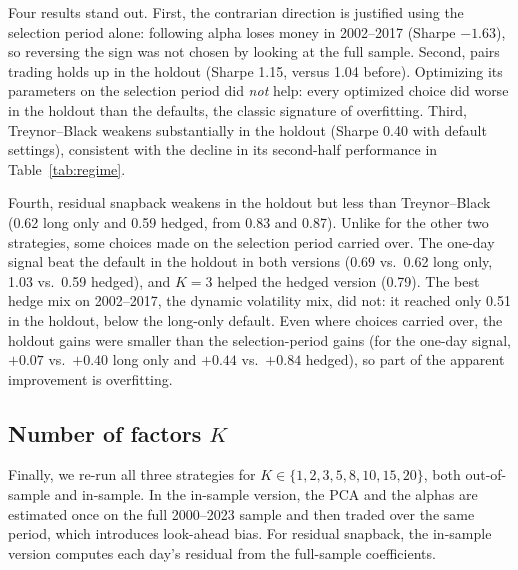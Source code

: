 \documentclass[12pt,letterpaper]{article}
\begin{document}
Four results stand out. First, the contrarian direction is justified using the selection period alone: following alpha loses money in 2002--2017 (Sharpe $-1.63$), so reversing the sign was not chosen by looking at the full sample. Second, pairs trading holds up in the holdout (Sharpe 1.15, versus 1.04 before). Optimizing its parameters on the selection period did \emph{not} help: every optimized choice did worse in the holdout than the defaults, the classic signature of overfitting. Third, Treynor--Black weakens substantially in the holdout (Sharpe 0.40 with default settings), consistent with the decline in its second-half performance in Table~\ref{tab:regime}.

Fourth, residual snapback weakens in the holdout but less than Treynor--Black (0.62 long only and 0.59 hedged, from 0.83 and 0.87). Unlike for the other two strategies, some choices made on the selection period carried over. The one-day signal beat the default in the holdout in both versions (0.69 vs.\ 0.62 long only, 1.03 vs.\ 0.59 hedged), and $K = 3$ helped the hedged version (0.79). The best hedge mix on 2002--2017, the dynamic volatility mix, did not: it reached only 0.51 in the holdout, below the long-only default. Even where choices carried over, the holdout gains were smaller than the selection-period gains (for the one-day signal, $+0.07$ vs.\ $+0.40$ long only and $+0.44$ vs.\ $+0.84$ hedged), so part of the apparent improvement is overfitting.

\subsection{Number of factors $K$}

Finally, we re-run all three strategies for $K \in \{1, 2, 3, 5, 8, 10, 15, 20\}$, both out-of-sample and in-sample. In the in-sample version, the PCA and the alphas are estimated once on the full 2000--2023 sample and then traded over the same period, which introduces look-ahead bias. For residual snapback, the in-sample version computes each day's residual from the full-sample coefficients.
\end{document}
